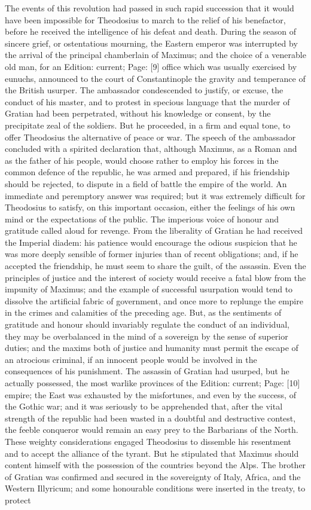 The events of this revolution had passed in such rapid succession that it would have been impossible for Theodosius to march to the relief of his benefactor, before he received the intelligence of his defeat and death. During the season of sincere grief, or ostentatious mourning, the Eastern emperor was interrupted by the arrival of the principal chamberlain of Maximus; and the choice of a venerable old man, for an Edition: current; Page: [9] office which was usually exercised by eunuchs, announced to the court of Constantinople the gravity and temperance of the British usurper. The ambassador condescended to justify, or excuse, the conduct of his master, and to protest in specious language that the murder of Gratian had been perpetrated, without his knowledge or consent, by the precipitate zeal of the soldiers. But he proceeded, in a firm and equal tone, to offer Theodosius the alternative of peace or war. The speech of the ambassador concluded with a spirited declaration that, although Maximus, as a Roman and as the father of his people, would choose rather to employ his forces in the common defence of the republic, he was armed and prepared, if his friendship should be rejected, to dispute in a field of battle the empire of the world. An immediate and peremptory answer was required; but it was extremely difficult for Theodosius to satisfy, on this important occasion, either the feelings of his own mind or the expectations of the public. The imperious voice of honour and gratitude called aloud for revenge. From the liberality of Gratian he had received the Imperial diadem: his patience would encourage the odious suspicion that he was more deeply sensible of former injuries than of recent obligations; and, if he accepted the friendship, he must seem to share the guilt, of the assassin. Even the principles of justice and the interest of society would receive a fatal blow from the impunity of Maximus; and the example of successful usurpation would tend to dissolve the artificial fabric of government, and once more to replunge the empire in the crimes and calamities of the preceding age. But, as the sentiments of gratitude and honour should invariably regulate the conduct of an individual, they may be overbalanced in the mind of a sovereign by the sense of superior duties; and the maxims both of justice and humanity must permit the escape of an atrocious criminal, if an innocent people would be involved in the consequences of his punishment. The assassin of Gratian had usurped, but he actually possessed, the most warlike provinces of the Edition: current; Page: [10] empire; the East was exhausted by the misfortunes, and even by the success, of the Gothic war; and it was seriously to be apprehended that, after the vital strength of the republic had been wasted in a doubtful and destructive contest, the feeble conqueror would remain an easy prey to the Barbarians of the North. These weighty considerations engaged Theodosius to dissemble his resentment and to accept the alliance of the tyrant. But he stipulated that Maximus should content himself with the possession of the countries beyond the Alps. The brother of Gratian was confirmed and secured in the sovereignty of Italy, Africa, and the Western Illyricum; and some honourable conditions were inserted in the treaty, to protect 